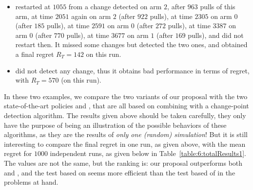 \begin{itemize}
    \item
    \CUSUMklUCB{} restarted at $1055$ from a change detected on arm $2$, after $963$ pulls of this arm, at time $2051$ again on arm $2$ (after $922$ pulls), at time $2305$ on arm $0$ (after $185$ pulls), at time $2591$ on arm $0$ (after $272$ pulls), at time $3387$ on arm $0$ (after $770$ pulls), at time $3677$ on arm $1$ (after $169$ pulls), and did not restart then.
    It missed some changes but detected the two ones, and obtained a final regret $R_T=142$ on this run.

    \item
    \MklUCB{} did not detect any change, thus it obtains bad performance in terms of regret, with $R_T = 570$ (on this run).
\end{itemize}


In these two examples, we compare the two variants of our proposal with the two state-of-the-art policies \CUSUMklUCB{} and \MklUCB,
that are all based on combining \klUCB{} with a change-point detection algorithm.
The results given above should be taken carefully, they only have the purpose of being an illustration of the possible behaviors of these algorithms, as they are the results of \emph{only one (random) simulation}!
But it is still interesting to compare the final regret in one run, as given above, with the mean regret for $1000$ independent runs, as given below in Table~\ref{table:6:totalResults1}.
The values are not the same, but the ranking is: our proposal outperforms both \CUSUMklUCB{} and \MklUCB, and the test based on \CUSUM{} seems more efficient than the test based of \MklUCB{} in the problems at hand.


